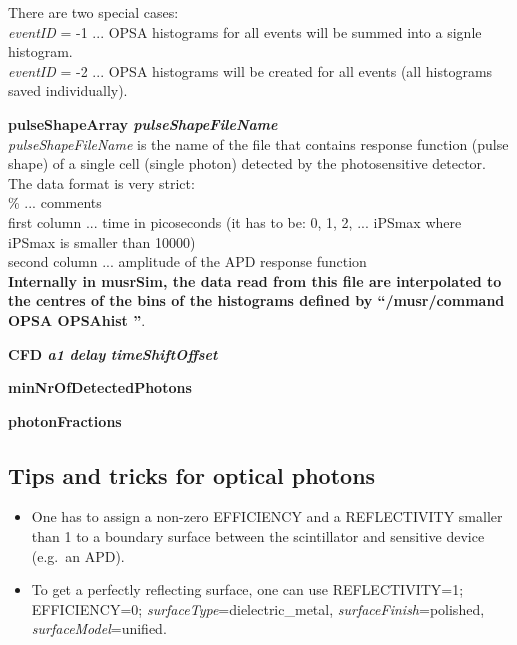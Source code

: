 \documentclass[twoside]{dis04}
\begin{document}
\begin{description}
\begin{description}
		There are two special cases:\\
		\emph{eventID} = -1 ... OPSA histograms for all events will be summed into 
		                        a signle histogram.\\
		\emph{eventID} = -2 ... OPSA histograms will be created for all events
		                        (all histograms saved individually).
	    \item{\bf pulseShapeArray \emph{pulseShapeFileName}}\\
	        \emph{pulseShapeFileName} is the name of the file that contains response 
		function (pulse shape) of a single cell (single photon) detected by 
		the photosensitive detector.  The data format is very strict:\\
		\% ... comments \\
		first column ...  time in picoseconds  (it has to be: 0, 1, 2, ... iPSmax
                                    where iPSmax is smaller than 10000)\\
                second column ... amplitude of the APD response function\\
		{\bf Internally in musrSim, the data read from this file are interpolated to the
		centres of the bins of the histograms defined by
		``/musr/command OPSA OPSAhist ''}.

	    \item{\bf CFD \emph{a1} \emph{delay} \emph{timeShiftOffset}}\\
	    \item{\bf minNrOfDetectedPhotons}\\
	    \item{\bf photonFractions}\\
       \end{description}

\end{description}


\subsection*{Tips and tricks for optical photons}
\begin{itemize}
   \item  One has to assign a non-zero EFFICIENCY and a REFLECTIVITY smaller than 1 to a boundary surface
          between the scintillator and sensitive device (e.g.\ an APD).
   \item  To get a perfectly reflecting surface, one can use REFLECTIVITY=1; EFFICIENCY=0; 
          \emph{surfaceType}=dielectric\_metal, \emph{surfaceFinish}=polished, \emph{surfaceModel}=unified.
	  
\end{itemize}
\end{document}
